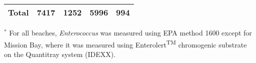 \documentclass[12pt]{article}\usepackage[]{graphicx}\usepackage[]{color}
\begin{document}
\begin{table}[h!tb]
\begin{center}
\begin{tabular}{l rr rr}
\hline
 Total & 7417 & 1252 & 5996 & 994 \\ 
  
\hline
\end{tabular}

\medskip

\begin{minipage}{0.7\textwidth}
\begin{scriptsize}
$^*$ For all beaches, \textit{Enterococcus} was measured using EPA method 1600 except for Mission Bay, where it was measured using Enterolert\textsuperscript{\scriptsize{TM}} chromogenic substrate on the Quantitray system (IDEXX). 
\end{scriptsize}
\end{minipage}
\end{center}
\end{table}
\end{document}
